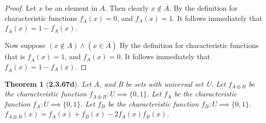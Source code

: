 \documentclass[a4paper, 12pt]{article}
\theoremstyle{plain}
\newtheorem*{theorem*}{Theorem}
\begin{document}
\begin{proof}
    Let $x$ be an element in $A$. Then clearly $x \notin \overline{A}$. By the definition for 
    characteristic functions $f_{\overline{A}}(x) = 0$, and $f_{A}(x) = 1$. It follows 
    immediately that $f_{\overline{A}}(x) = 1 - f_{A}(x)$.
    
    Now suppose $(x \notin A) \land (x \in \overline{A})$ By the definition for characteristic 
    functions that is $f_{\overline{A}}(x) = 1$, and $f_{A}(x) = 0$. It follows immediately 
    that $f_{\overline{A}}(x) = 1 - f_{A}(x)$.
\end{proof}

\pagebreak


\begin{theorem*}[\textbf{2.3.67d}]
    Let A, and B be sets with universal set U. Let $f_{A \oplus B}$ be the characteristic 
    function $f_{A \oplus B}: U \implies \{0, 1\}$. Let $f_{A}$ be the characteristic function 
    $f_{A}: U \implies \{0, 1\}$. Let $f_{B}$ be the characteristic function \newline 
    $f_{B}: U \implies \{0, 1\}$. $f_{A \oplus B}(x) = f_{A}(x) + f_{B}(x) - 2f_{A}(x)f_{B}(x)$.
\end{theorem*}
\end{document}
